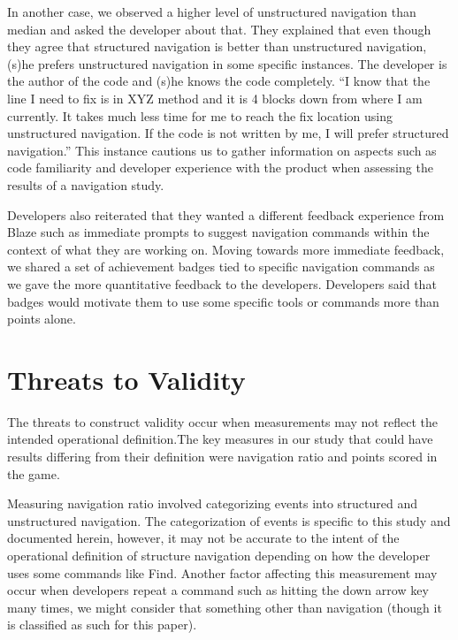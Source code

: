 \documentclass{sig-alternate}
\begin{document}
In another case, we observed a higher level of unstructured navigation than median and asked the developer about that.  They explained that even though they agree that structured navigation is better than unstructured navigation, (s)he prefers unstructured navigation in some specific instances. The developer is the author of the code and (s)he knows the code completely. ``I know that the line I need to fix is in XYZ method and it is 4 blocks down from where I am currently. It takes much less time for me to reach the fix location using unstructured navigation. If the code is not written by me, I will prefer structured navigation.'' This instance cautions us to gather information on aspects such as code familiarity and developer experience with the product when assessing the results of a navigation study.


Developers also reiterated that they wanted a different feedback experience from Blaze  such as immediate prompts to suggest navigation commands within the context of what they are working on.  Moving towards more immediate feedback, we shared a set of achievement badges tied to specific navigation commands  as we gave the more quantitative feedback to the developers.   Developers said that badges would motivate them to use some specific tools or commands more than points alone. 

\section{Threats to Validity}
The threats to construct validity occur when measurements may not reflect the intended operational definition.The key measures in our study that could have results differing from their definition were navigation ratio and points scored in the game.  

Measuring navigation ratio involved categorizing events into structured and unstructured navigation.  The categorization of events is specific to this study and documented herein, however, it may not be accurate to the intent of the operational definition of structure navigation depending on how the developer uses some commands like Find.  Another factor affecting this measurement may occur when developers repeat a command such as hitting the down arrow key many times, we might consider that something other than navigation (though it is classified as such for this paper).  
\end{document}
